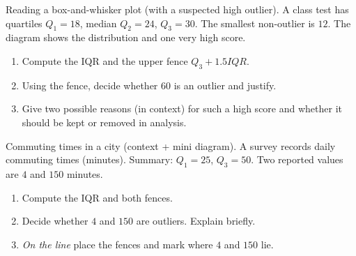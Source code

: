 \documentclass[11pt]{article}
\def\textbf#1{#1}%
\def\mathrm#1{#1}%
\newcounter{question}
\begin{document}
\begin{question}
\textbf{Reading a box-and-whisker plot (with a suspected high outlier).}
A class test has quartiles $Q_1=18$, median $Q_2=24$, $Q_3=30$. The smallest non-outlier is $12$.  
The diagram shows the distribution and one very high score.

\begin{center}
\end{center}

\begin{enumerate}
  \item Compute the IQR and the upper fence $Q_3+1.5\mathrm{IQR}$.
  \item Using the fence, decide whether $60$ is an outlier and justify.
  \item Give two possible reasons (in context) for such a high score and whether it should be kept or removed in analysis.
\end{enumerate}
\end{question}


\begin{question}
\textbf{Commuting times in a city (context + mini diagram).}
A survey records daily commuting times (minutes). Summary: $Q_1=25$, $Q_3=50$.  
Two reported values are $4$ and $150$ minutes.
\begin{enumerate}
  \item Compute the IQR and both fences.
  \item Decide whether $4$ and $150$ are outliers. Explain briefly.
  \item \emph{On the line} place the fences and mark where $4$ and $150$ lie.
\end{enumerate}

\begin{center}
\end{center}
\end{question}
\end{document}
